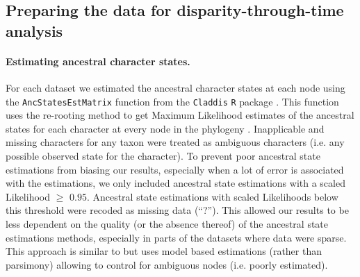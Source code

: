 \documentclass[12pt,a4paper]{article}
\begin{document}
% 

\subsection{Preparing the data for disparity-through-time analysis}

\paragraph{Estimating ancestral character states.}
\label{ace}
For each dataset we estimated the ancestral character states at each node using the \texttt{AncStatesEstMatrix} function from the \texttt{Claddis} \texttt{R} package \citep{Claddis,R}.
This function uses the re-rooting method \citep{Yang01121995,Garland2000} to get Maximum Likelihood estimates of the ancestral states for each character at every node in the phylogeny \citep[based on the \texttt{rerootingMethod} function in \texttt{phytools};][]{phytools}.
Inapplicable and missing characters for any taxon were treated as ambiguous characters (i.e. any possible observed state for the character).
To prevent poor ancestral state estimations from biasing our results, especially when a lot of error is associated with the estimations, we only included ancestral state estimations with a scaled Likelihood $\geq$ $0.95$.
Ancestral state estimations with scaled Likelihoods below this threshold were recoded as missing data (``?'').
This allowed our results to be less dependent on the quality (or the absence thereof) of the ancestral state estimations methods, especially in parts of the datasets where data were sparse. 
This approach is similar to \cite{brusatte2011phylogenetic} but uses model based estimations (rather than parsimony) allowing to control for ambiguous nodes (i.e. poorly estimated).
\end{document}
